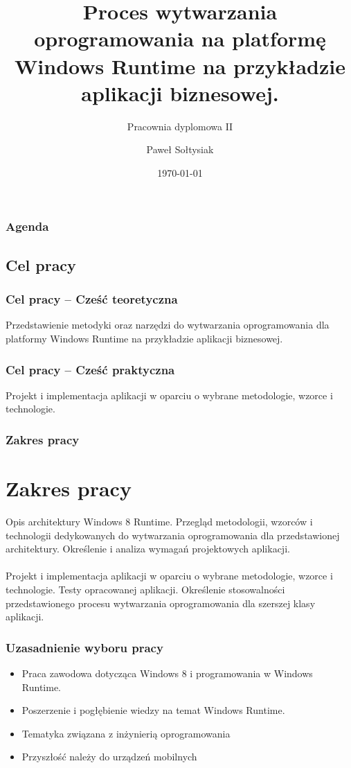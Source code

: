 \documentclass{beamer}
\title{Proces wytwarzania oprogramowania na platformę Windows Runtime na przykładzie aplikacji biznesowej.}
\subtitle{Pracownia dyplomowa II}
\author{Paweł Sołtysiak}
\institute{Opiekun pracy: dr inż.  Witold Maćków\\Kierownik Katedry: prof. dr hab. inż. Włodzimierz Bielecki}
\date{\today}
\begin{document}
\begin{frame}
\titlepage
\end{frame} 

\begin{frame}
\frametitle{Agenda} 
\tableofcontents
\end{frame} 

\begin{frame}
\section{Cel pracy}
\frametitle{Cel pracy -- Cześć teoretyczna} 
Przedstawienie metodyki oraz narzędzi do wytwarzania oprogramowania dla platformy Windows Runtime na przykładzie aplikacji biznesowej.
\end{frame}

\begin{frame}
\frametitle{Cel pracy -- Cześć praktyczna} 
Projekt i implementacja aplikacji w oparciu o wybrane metodologie, wzorce i technologie.
\end{frame}

\begin{frame}
\frametitle{Zakres pracy} 
\section{Zakres pracy}
Opis architektury Windows 8 Runtime. Przegląd metodologii, wzorców i technologii dedykowanych do wytwarzania oprogramowania dla przedstawionej architektury. Określenie i analiza wymagań projektowych aplikacji.\\
~\\
Projekt i implementacja aplikacji w oparciu o wybrane metodologie, wzorce i technologie. Testy opracowanej aplikacji. Określenie stosowalności przedstawionego procesu wytwarzania oprogramowania dla szerszej klasy aplikacji.
\end{frame}


\begin{frame}
\frametitle{Uzasadnienie wyboru pracy} 
\begin{itemize}
\item Praca zawodowa dotycząca Windows 8 i programowania w Windows Runtime.
\item Poszerzenie i pogłębienie wiedzy na temat Windows Runtime.
\item Tematyka związana z inżynierią oprogramowania
\item Przyszłość należy do urządzeń mobilnych 
\end{itemize}
\end{frame}
\end{document}
